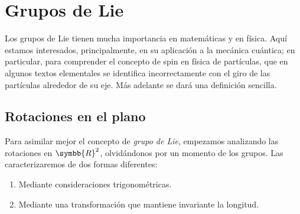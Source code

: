 %

\chapter{Grupos de Lie}
\label{ch:gruposlie}
Los grupos de Lie tienen mucha importancia en matemáticas y en física.
Aquí estamos interesados, principalmente, en su aplicación a la mecánica cuántica; en
particular, para comprender el concepto de spin en física de partículas, que en algunos
textos elementales se identifica incorrectamente con el giro de las partículas alrededor
de su eje. Más adelante se dará una definición sencilla.

\section{Rotaciones en el plano}
Para asimilar mejor el concepto de \emph{grupo de Lie}, empezamos analizando las rotaciones en $\symbb{R}^2$, olvidándonos por un momento de los grupos.
Las caracterizaremos de dos formas diferentes:
\begin{enumerate}
\item Mediante consideraciones trigonométricas.
\item Mediante una transformación que mantiene invariante la longitud.
\end{enumerate}


